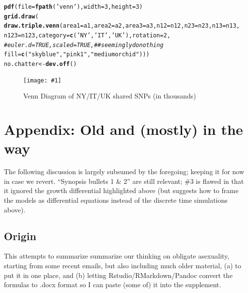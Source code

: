 \documentclass{article}\usepackage[]{graphicx}\usepackage[]{color}
\makeatletter
\newcommand{\hlnum}[1]{\textcolor[rgb]{0.686,0.059,0.569}{#1}}%
\newcommand{\hlstr}[1]{\textcolor[rgb]{0.192,0.494,0.8}{#1}}%
\newcommand{\hlcom}[1]{\textcolor[rgb]{0.678,0.584,0.686}{\textit{#1}}}%
\newcommand{\hlstd}[1]{\textcolor[rgb]{0.345,0.345,0.345}{#1}}%
\newcommand{\hlkwb}[1]{\textcolor[rgb]{0.69,0.353,0.396}{#1}}%
\newcommand{\hlkwc}[1]{\textcolor[rgb]{0.333,0.667,0.333}{#1}}%
\newcommand{\hlkwd}[1]{\textcolor[rgb]{0.737,0.353,0.396}{\textbf{#1}}}%
\newenvironment{kframe}{%
 \def\at@end@of@kframe{}%
 \ifinner\ifhmode%
  \def\at@end@of@kframe{\end{minipage}}%
  \begin{minipage}{\columnwidth}%
 \fi\fi%
 \def\FrameCommand##1{\hskip\@totalleftmargin \hskip-\fboxsep
 \colorbox{shadecolor}{##1}\hskip-\fboxsep
     \hskip-\linewidth \hskip-\@totalleftmargin \hskip\columnwidth}%
 \MakeFramed {\advance\hsize-\width
   \@totalleftmargin\z@ \linewidth\hsize
   \@setminipage}}%
 {\par\unskip\endMakeFramed%
 \at@end@of@kframe}
\newenvironment{knitrout}{}{} %
\newcommand{\dofig}[3]{%
  \begin{figure}%
    \begin{center}%
      \texttt{[image: \#1]}%
      \caption{#2}%
      \label{#3}%
    \end{center}%
  \end{figure}%
}
\makeatother
\begin{document}
\begin{knitrout}\footnotesize
{}\color{fgcolor}\begin{kframe}
\begin{alltt}
\hlkwd{pdf}\hlstd{(}\hlkwc{file}\hlstd{=}\hlkwd{fpath}\hlstd{(}\hlstr{'venn'}\hlstd{),} \hlkwc{width}\hlstd{=}\hlnum{3}\hlstd{,} \hlkwc{height}\hlstd{=}\hlnum{3}\hlstd{)}
\hlkwd{grid.draw}\hlstd{(}
  \hlkwd{draw.triple.venn}\hlstd{(}\hlkwc{area1} \hlstd{= a1,} \hlkwc{area2} \hlstd{= a2,} \hlkwc{area3} \hlstd{= a3,} \hlkwc{n12} \hlstd{= n12,} \hlkwc{n23} \hlstd{= n23,} \hlkwc{n13} \hlstd{= n13,}
    \hlkwc{n123} \hlstd{= n123,} \hlkwc{category} \hlstd{=} \hlkwd{c}\hlstd{(}\hlstr{'NY'}\hlstd{,}\hlstr{'IT'}\hlstd{,}\hlstr{'UK'}\hlstd{),}  \hlkwc{rotation}\hlstd{=}\hlnum{2}\hlstd{,}
    \hlcom{# euler.d = TRUE, scaled = TRUE, ## seemingly do nothing}
    \hlkwc{fill} \hlstd{=} \hlkwd{c}\hlstd{(}\hlstr{"skyblue"}\hlstd{,} \hlstr{"pink1"}\hlstd{,} \hlstr{"mediumorchid"}\hlstd{)))}
\hlstd{no.chatter} \hlkwb{<-} \hlkwd{dev.off}\hlstd{()}
\end{alltt}
\end{kframe}
\end{knitrout}

\dofig{asex-figs-mine/venn.pdf}{Venn Diagram of NY/IT/UK shared SNPs (in thousands)}{fig:venn}


\section{Appendix: Old and (mostly) in the way}

The following discussion is largely subsumed by the foregoing; keeping it for now in case we revert.
``Synopsis bullets 1 \& 2'' are still relevant; \#3 is flawed in that it ignored the growth
differential highlighted above (but suggests how to frame the models as differential equations
instead of the discrete time simulations above).

\subsection{Origin}

This attempts to summarize summarize our thinking on obligate asexuality, starting from some recent
emails, but also including much older material, (a) to put it in one place, and (b) letting
Rstudio/RMarkdown/Pandoc convert the formulas to .docx format so I can paste (some of) it into the
supplement.
\end{document}
